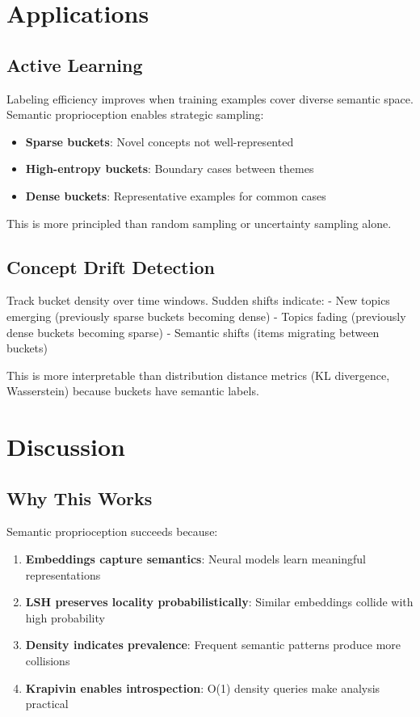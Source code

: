 \documentclass[
]{article}
\providecommand{\tightlist}{%
  \setlength{\itemsep}{0pt}\setlength{\parskip}{0pt}}
\begin{document}
\section{Applications}\label{applications}

\subsection{Active Learning}\label{active-learning}

Labeling efficiency improves when training examples cover diverse
semantic space. Semantic proprioception enables strategic sampling:

\begin{itemize}
\tightlist
\item
  \textbf{Sparse buckets}: Novel concepts not well-represented
\item
  \textbf{High-entropy buckets}: Boundary cases between themes
\item
  \textbf{Dense buckets}: Representative examples for common cases
\end{itemize}

This is more principled than random sampling or uncertainty sampling
alone.

\subsection{Concept Drift Detection}\label{concept-drift-detection}

Track bucket density over time windows. Sudden shifts indicate: - New
topics emerging (previously sparse buckets becoming dense) - Topics
fading (previously dense buckets becoming sparse) - Semantic shifts
(items migrating between buckets)

This is more interpretable than distribution distance metrics (KL
divergence, Wasserstein) because buckets have semantic labels.

\section{Discussion}\label{discussion}

\subsection{Why This Works}\label{why-this-works}

Semantic proprioception succeeds because:

\begin{enumerate}
\def\labelenumi{\arabic{enumi}.}
\tightlist
\item
  \textbf{Embeddings capture semantics}: Neural models learn meaningful
  representations
\item
  \textbf{LSH preserves locality probabilistically}: Similar embeddings
  collide with high probability
\item
  \textbf{Density indicates prevalence}: Frequent semantic patterns
  produce more collisions
\item
  \textbf{Krapivin enables introspection}: O(1) density queries make
  analysis practical
\end{enumerate}
\end{document}
